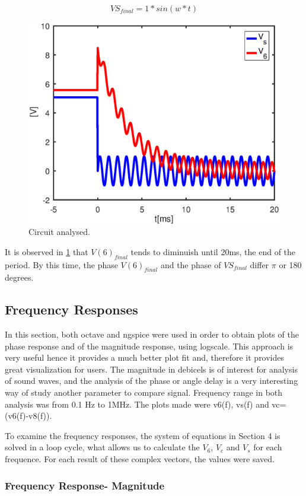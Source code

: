 \begin{equation}
VS_{final}=1*sin(w*t)
\end{equation}

\begin{figure}[h] \centering
\includegraphics[width=0.5\linewidth]{part4.eps}
\caption{Circuit analysed.}
\label{fig:part4}
\end{figure}

\par It is observed in \ref{fig:part4} that $V(6)_{final}$ tends to diminuish  until 20ms, the end of the period. By this time, the phase $V(6)_{final}$ and the phase of  $VS_{final}$ differ $\pi$ or 180 degrees.




\subsection{Frequency Responses}

In this section, both octave and ngspice were used in order to obtain plots of the phase response and of the magnitude response, using logscale. This approach is very useful hence it provides a much better plot fit and, therefore it provides great visualization for users. The magnitude in debicels is of interest for analysis of sound waves, and the analysis of the phase or angle delay is a very interesting way of study another parameter to compare signal. Frequency range in both analysis was from 0.1 Hz to 1MHz. The plots made were v6(f), vs(f) and vc=(v6(f)-v8(f)).



To examine the frequency responses, the system of equations in Section 4 is solved in a loop cycle, what allows us to calculate the $V_6$, $V_c$ and $V_s$ for each frequence. For each result of these complex vectors, the values were saved.

\subsubsection{Frequency Response- Magnitude}

